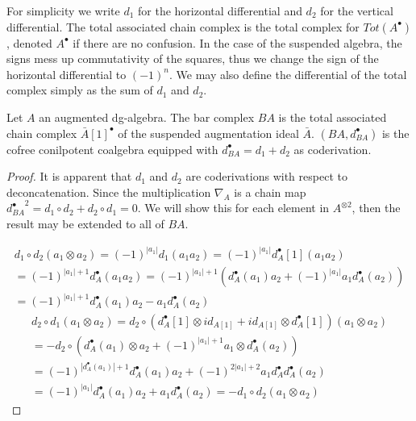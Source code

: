\documentclass[../thesis.tex]{subfiles}
\begin{document}
            For simplicity we write $d_1$ for the horizontal differential and $d_2$ for the vertical differential. The total associated chain complex is the total complex for $Tot(A^\bullet)$, denoted $A^\bullet$ if there are no confusion. In the case of the suspended algebra, the signs mess up commutativity of the squares, thus we change the sign of the horizontal differential to $(-1)^n$. We may also define the differential of the total complex simply as the sum of $d_1$ and $d_2$.

            \begin{proposition}
                Let $A$ an augmented dg-algebra. The bar complex $BA$ is the total associated chain complex $\bar{A}[1]^\bullet$ of the suspended augmentation ideal $\bar{A}$. $(BA, d_{BA}^\bullet)$ is the cofree conilpotent coalgebra equipped with $d_{BA}^\bullet = d_1 + d_2$ as coderivation.
            \end{proposition}

            \begin{proof}
                    It is apparent that $d_1$ and $d_2$ are coderivations with respect to deconcatenation. Since the multiplication $\nabla_A$ is a chain map ${d_{BA}^\bullet}^2 = d_1 \circ d_2 + d_2 \circ d_1= 0$. We will show this for each element in $A^{\otimes 2}$, then the result may be extended to all of $BA$.

                \begin{multline*}
                    d_1 \circ d_2 (a_1\otimes a_2) = (-1)^{|a_1|}d_1 (a_1a_2) = (-1)^{|a_1|}d_A^\bullet[1](a_1a_2) \\ = (-1)^{|a_1|+1}d_A^\bullet(a_1a_2) = (-1)^{|a_1|+1}(d_A^\bullet(a_1)a_2 + (-1)^{|a_1|}a_1d_A^\bullet(a_2)) \\ = (-1)^{|a_1|+1}d_A^\bullet(a_1)a_2 - a_1d_A^\bullet(a_2)
                \end{multline*}
                \begin{multline*}
                    d_2\circ d_1 (a_1\otimes a_2) = d_2\circ (d_A^\bullet[1]\otimes id_{A[1]} + id_{A[1]}\otimes d_A^\bullet[1]) (a_1\otimes a_2) \\ = -d_2 \circ (d_A^\bullet(a_1)\otimes a_2 + (-1)^{|a_1|+1}a_1\otimes d_A^\bullet(a_2)) \\ = (-1)^{|d_A^\bullet(a_1)|+1}d_A^\bullet(a_1)a_2 + (-1)^{2|a_1|+2}a_1d_A^\bullet d_A^\bullet(a_2) \\ = (-1)^{|a_1|}d_A^\bullet(a_1)a_2 + a_1d_A^\bullet (a_2) = -d_1\circ d_2 (a_1\otimes a_2)
                \end{multline*}
            \end{proof}
\end{document}
